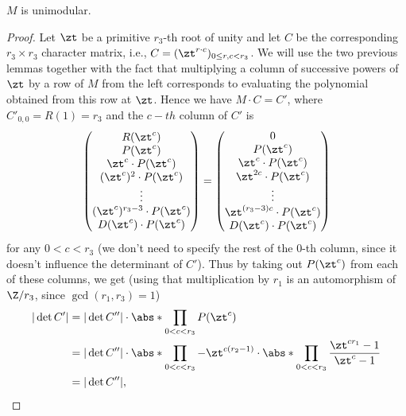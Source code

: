 \begin{prop}\label{unimod}
$M$ is unimodular.
\end{prop}
\begin{proof}
Let $\zt$ be a primitive $r_3$-th root of unity and let $C$ be the corresponding $r_3\times r_3$ character matrix, i.e., $C=(\zt^{r\cdot c})_{0\leq r,c<r_3}$. We will use the two previous lemmas together with the fact that multiplying a column of successive powers of $\zt$ by a row of $M$ from the left corresponds to evaluating the polynomial obtained from this row at $\zt$. %
Hence we have $M\cdot C=C'$, where $C'_{0,0}=R(1)=r_3$ and the $c-th$ column of $C'$ is
$$
\begin{pmatrix}
R(\zt^c)\\ 
P(\zt^c) \\ 
\zt^c \cdot P(\zt^c) \\ 
(\zt^{c})^2 \cdot P(\zt^c) \\ 
\vdots\\ 
(\zt^{c})^{r_3-3} \cdot P(\zt^c) \\ 
D(\zt^c) \cdot P(\zt^c)
\end{pmatrix}
=
\begin{pmatrix}
0\\ 
P(\zt^c) \\ 
\zt^c \cdot P(\zt^c) \\ 
\zt^{2c} \cdot P(\zt^c) \\ 
\vdots\\ 
\zt^{(r_3-3)c} \cdot P(\zt^c) \\ 
D(\zt^c) \cdot P(\zt^c)
\end{pmatrix}
$$
for any $0<c<r_3$ (we don't need to specify the rest of the $0$-th column, since it doesn't influence the determinant of $C'$). Thus by taking out $P(\zt^c)$ from each of these columns, we get (using that multiplication by $r_1$ is an automorphism of $\Z/r_3$, since $\gcd(r_1,r_3)=1$)
\begin{align*}
|\det C'|&=|\det C''|\cdot\abs*{\prod_{0<c<r_3}P(\zt^c)}\\
&=|\det C''|\cdot\abs*{\prod_{0<c<r_3}-\zt^{c(r_2-1)}}\cdot\abs*{\prod_{0<c<r_3}\frac{\zt^{cr_1}-1}{\zt^c-1}}\\
&=|\det C''|,
\end{align*}


\end{proof}

